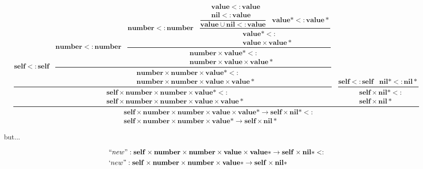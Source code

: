 \documentclass[12pt]{article}
\newcommand{\Top}{\mathbf{value}}
\newcommand{\Nil}{\mathbf{nil}}
\newcommand{\Self}{\mathbf{self}}
\newcommand{\Number}{\mathbf{number}}
\newcommand{\TopStar}{\Top{*}}
\newcommand{\NilStar}{\Nil{*}}
\newcommand{\subtype}{<:}
\begin{document}
\begin{scriptsize}
\[
\dfrac
{
\dfrac
{
\Self \subtype \Self \;\;\;
\dfrac
{
\Number \subtype \Number \;\;\;
\dfrac
{
\Number \subtype \Number \;\;\;
\dfrac
{
\dfrac
{
\begin{aligned}
& \Top \subtype \Top \\
& \Nil \subtype \Top
\end{aligned}
}
{\Top \cup \Nil \subtype \Top} \;\;\;
\TopStar \subtype \TopStar
}
{
\begin{aligned}
& \TopStar \subtype \\
& \Top \times \TopStar
\end{aligned}
}
}
{
\begin{aligned}
& \Number \times \TopStar \subtype \\
& \Number \times \Top \times \TopStar
\end{aligned}
}
}
{
{
\begin{aligned}
& \Number \times \Number \times \TopStar \subtype \\
& \Number \times \Number \times \Top \times \TopStar
\end{aligned}
}
}
}
{
\begin{aligned}
& \Self \times \Number \times \Number \times \TopStar \subtype \\
& \Self \times \Number \times \Number \times \Top \times \TopStar
\end{aligned}
}
\;\;\;
\dfrac
{
\Self \subtype \Self \;\;\;
\NilStar \subtype \NilStar
}
{
\begin{aligned}
& \Self \times \NilStar \subtype \\
& \Self \times \NilStar
\end{aligned}
}
}
{
\begin{aligned}
& \Self \times \Number \times \Number \times \Top \times \TopStar \rightarrow \Self \times \NilStar \subtype \\
& \Self \times \Number \times \Number \times \TopStar \rightarrow \Self \times \NilStar
\end{aligned}
}
\]
\end{scriptsize}

but...

\[
\begin{aligned}
& ``new":\Self \times \Number \times \Number \times \Top \times \TopStar \rightarrow \Self \times \NilStar \subtype \\
& `new":\Self \times \Number \times \Number \times \TopStar \rightarrow \Self \times \NilStar
\end{aligned}
\]
\end{document}
